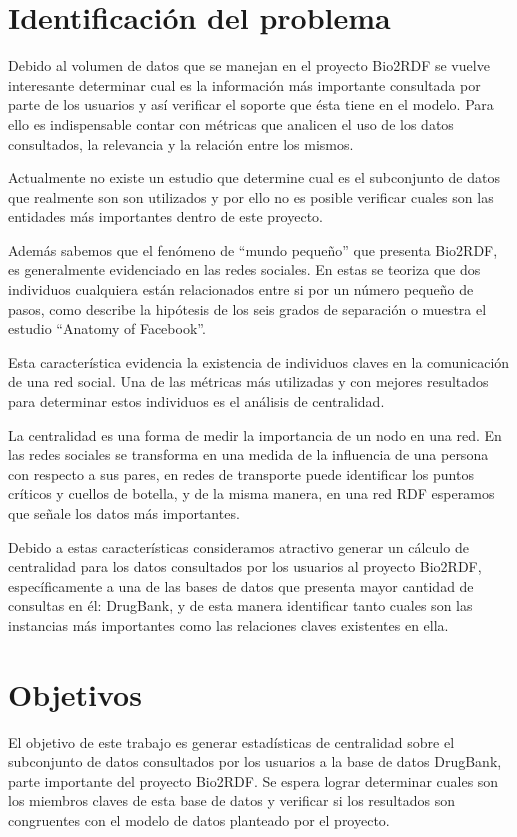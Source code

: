 \section{Identificación del problema}
Debido al volumen de datos que se manejan en el proyecto Bio2RDF se vuelve
interesante determinar cual es la información más importante consultada por
parte de los usuarios y así verificar el soporte que ésta tiene en el modelo. 
Para ello es indispensable contar con métricas que analicen el uso de los datos
consultados, la relevancia y la relación entre los mismos.

Actualmente no existe un estudio que determine cual es el subconjunto de datos
que realmente son son utilizados y por ello no es posible verificar cuales son
las entidades más importantes dentro de este proyecto.

Además sabemos que el fenómeno de ``mundo pequeño'' que presenta Bio2RDF, es
generalmente evidenciado en las redes sociales. En estas se 
teoriza que dos individuos cualquiera están relacionados entre si por un número
pequeño de pasos, como describe la hipótesis de los seis grados de separación o
muestra el estudio ``Anatomy of Facebook''\cite{ugander2011anatomy}.

Esta característica evidencia la existencia de individuos claves en la
comunicación de una red social. 
Una de las métricas más utilizadas y con mejores resultados para determinar
estos individuos es el análisis de centralidad.

La centralidad es una forma de medir la importancia de un nodo en una red.
En las redes sociales se transforma en una medida de la influencia de una
persona con respecto a sus pares, en redes de transporte puede identificar los
puntos críticos y cuellos de botella, y de la misma manera, en una red RDF
esperamos que señale los datos más importantes.

Debido a estas características consideramos atractivo generar un cálculo de
centralidad para los datos consultados por los usuarios al proyecto Bio2RDF,
específicamente a una de las bases de datos que presenta mayor cantidad de
consultas en él: DrugBank, y de esta manera identificar tanto cuales son las
instancias más importantes como las relaciones claves existentes en ella.

\section{Objetivos}

El objetivo de este trabajo es generar estadísticas de centralidad sobre el
subconjunto de datos consultados por los usuarios a la base de datos DrugBank,
parte importante del proyecto Bio2RDF.
Se espera lograr determinar cuales son los miembros claves de esta base de datos
y verificar si los resultados son congruentes con el modelo de datos planteado
por el proyecto.

